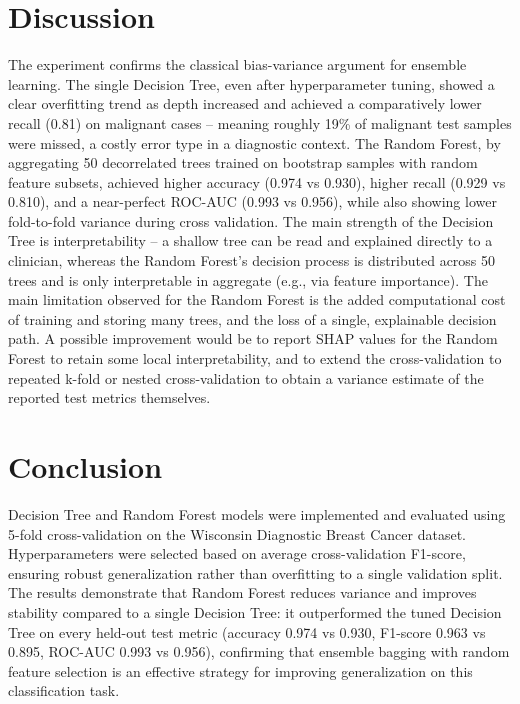 \documentclass[12pt,a4paper]{article}
\begin{document}
\section{Discussion}
The experiment confirms the classical bias-variance argument for ensemble learning. The single
Decision Tree, even after hyperparameter tuning, showed a clear overfitting trend as depth
increased and achieved a comparatively lower recall (0.81) on malignant cases -- meaning roughly
19\% of malignant test samples were missed, a costly error type in a diagnostic context. The
Random Forest, by aggregating 50 decorrelated trees trained on bootstrap samples with random
feature subsets, achieved higher accuracy (0.974 vs 0.930), higher recall (0.929 vs 0.810), and a
near-perfect ROC-AUC (0.993 vs 0.956), while also showing lower fold-to-fold variance during cross
validation. The main strength of the Decision Tree is interpretability -- a shallow tree can be
read and explained directly to a clinician, whereas the Random Forest's decision process is
distributed across 50 trees and is only interpretable in aggregate (e.g., via feature importance).
The main limitation observed for the Random Forest is the added computational cost of training and
storing many trees, and the loss of a single, explainable decision path. A possible improvement
would be to report SHAP values for the Random Forest to retain some local interpretability, and to
extend the cross-validation to repeated k-fold or nested cross-validation to obtain a variance
estimate of the reported test metrics themselves.

\section{Conclusion}
Decision Tree and Random Forest models were implemented and evaluated using 5-fold
cross-validation on the Wisconsin Diagnostic Breast Cancer dataset. Hyperparameters were selected
based on average cross-validation F1-score, ensuring robust generalization rather than overfitting
to a single validation split. The results demonstrate that Random Forest reduces variance and
improves stability compared to a single Decision Tree: it outperformed the tuned Decision Tree on
every held-out test metric (accuracy 0.974 vs 0.930, F1-score 0.963 vs 0.895, ROC-AUC 0.993 vs
0.956), confirming that ensemble bagging with random feature selection is an effective strategy
for improving generalization on this classification task.
\end{document}
